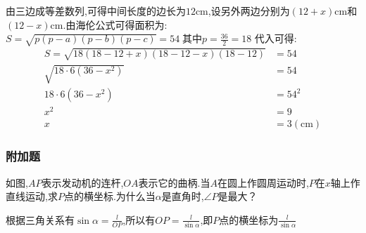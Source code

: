 \begin{questions}
\begin{solution}

		由三边成等差数列,可得中间长度的边长为$12$cm,设另外两边分别为$(12+x)$cm和$(12-x)$cm.由海伦公式可得面积为:
		\begin{math}
			S = \sqrt{p(p-a)(p-b)(p-c)} = 54\; \text{其中} p = \frac{36}{2} = 18
		\end{math}
		代入可得:
		\begin{align*}
			S = \sqrt{18(18 - 12 + x)(18 - 12 - x)(18 - 12)} & = 54              \\
			\sqrt{18\cdot 6 (36-x^2)}                        & = 54              \\
			18\cdot 6 (36- x^2)                              & = 54^2            \\
			x^2                                              & = 9               \\
			x                                                & = 3 (\mathrm{cm})
		\end{align*}

	\end{solution}

	\begin{center}
		\subsubsection*{附加题}
	\end{center}

	\question
	如图,$AP$表示发动机的连杆,$OA$表示它的曲柄.当$A$在圆上作圆周运动时,$P$在$x$轴上作直线运动,求$P$点的横坐标.为什么当$\alpha$是直角时,$\angle{P}$是最大？

	\begin{solution}
		根据三角关系有$\sin\alpha = \frac{l}{OP}$,所以有$OP =
			\frac{l}{\sin\alpha}$,即$P$点的横坐标为$\frac{l}{\sin\alpha}$


\end{solution}
\end{questions}
